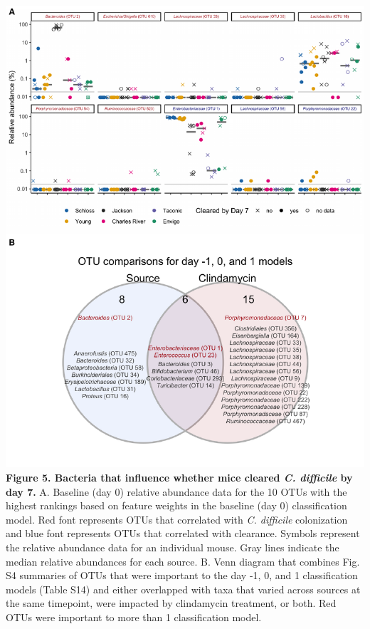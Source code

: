 \documentclass[
  11pt,
]{article}
\begin{document}
\newpage

\includegraphics{figure_5.pdf} \textbf{Figure 5. Bacteria that influence
whether mice cleared \emph{C. difficile} by day 7.} A. Baseline (day 0)
relative abundance data for the 10 OTUs with the highest rankings based
on feature weights in the baseline (day 0) classification model. Red
font represents OTUs that correlated with \emph{C. difficile}
colonization and blue font represents OTUs that correlated with
clearance. Symbols represent the relative abundance data for an
individual mouse. Gray lines indicate the median relative abundances for
each source. B. Venn diagram that combines Fig. S4 summaries of OTUs
that were important to the day -1, 0, and 1 classification models (Table
S14) and either overlapped with taxa that varied across sources at the
same timepoint, were impacted by clindamycin treatment, or both. Red
OTUs were important to more than 1 classification model.

\newpage
\end{document}
